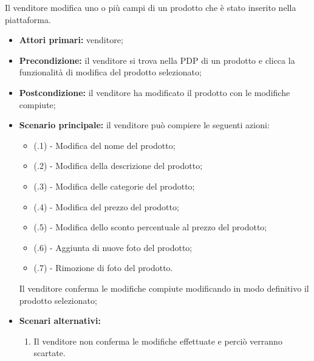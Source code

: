 

Il venditore modifica uno o più campi di un prodotto che è stato inserito nella piattaforma.
\begin{itemize}
    \item \textbf{Attori primari:} venditore;
    \item \textbf{Precondizione:} il venditore si trova nella PDP di un prodotto e clicca la funzionalità di modifica del prodotto selezionato;
    \item \textbf{Postcondizione:} il venditore ha modificato il prodotto con le modifiche compiute;
    \item \textbf{Scenario principale:} il venditore può compiere le seguenti azioni:
    \begin{itemize}
        \item (\actualUC.1) - Modifica del nome del prodotto;
        \item (\actualUC.2) - Modifica della descrizione del prodotto;
        \item (\actualUC.3) - Modifica delle categorie del prodotto;
        \item (\actualUC.4) - Modifica del prezzo del prodotto;
        \item (\actualUC.5) - Modifica dello sconto percentuale al prezzo del prodotto;
        \item (\actualUC.6) - Aggiunta di nuove foto del prodotto;
        \item (\actualUC.7) - Rimozione di foto del prodotto.
    \end{itemize}
    Il venditore conferma le modifiche compiute modificando in modo definitivo il prodotto selezionato;
    \item \textbf{Scenari alternativi:}
    \begin{enumerate}[label=\lett]
    	\item Il venditore non conferma le modifiche effettuate e perciò verranno scartate.
    \end{enumerate}
\end{itemize}

